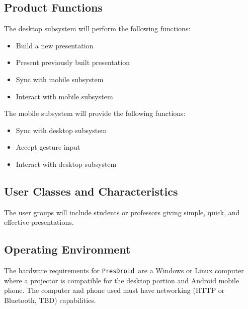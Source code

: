 \documentclass{article}
\newcommand{\pd}{\texttt{PresDroid }}
\begin{document}
\subsection{Product Functions}
The desktop subsystem will perform the following functions:
\begin{itemize}
\item Build a new presentation
\item Present previously built presentation
\item Sync with mobile subsystem
\item Interact with mobile subsystem
\end{itemize}

The mobile subsystem will provide the following functions:
\begin{itemize}
\item Sync with desktop subsystem
\item Accept gesture input
\item Interact with desktop subsystem
\end{itemize}

\subsection{User Classes and Characteristics}
The user groups will include students or professors giving simple, quick, and effective presentations.

\subsection{Operating Environment}
The hardware requirements for \pd are a Windows or Linux computer where a projector is compatible for the desktop portion and Android mobile phone.
The computer and phone used must have networking (HTTP or Bluetooth, TBD) capabilities.
\end{document}
